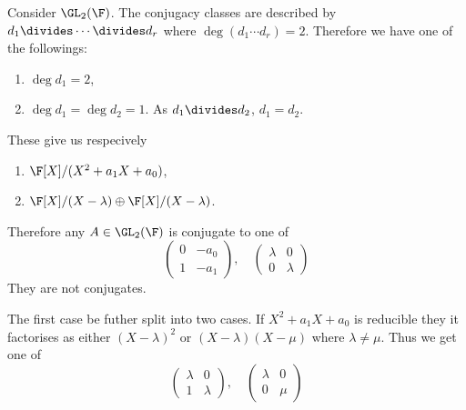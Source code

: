 \documentclass[a4paper]{article}
\theoremstyle{definition}
\begin{document}
\begin{eg}
  Consider \(\GL_2(\F)\). The conjugacy classes are described by \(d_1 \divides \cdots \divides d_r\) where \(\deg (d_1 \cdots d_r) = 2\). Therefore we have one of the followings:
  \begin{enumerate}
  \item \(\deg d_1 = 2\),
  \item \(\deg d_1 = \deg d_2 = 1\). As \(d_1 \divides d_2\), \(d_1 = d_2\).
  \end{enumerate}
  These give us respecively
  \begin{enumerate}
  \item \(\F[X]/(X^2 + a_1X + a_0)\),
  \item \(\F[X]/(X - \lambda) \oplus \F[X]/(X - \lambda)\).
  \end{enumerate}

  Therefore any \(A \in \GL_2(\F)\) is conjugate to one of
  \[
    \begin{pmatrix}
      0 & -a_0 \\
      1 & -a_1
    \end{pmatrix}
    ,\quad
    \begin{pmatrix}
      \lambda & 0 \\
      0 & \lambda
    \end{pmatrix}
  \]
  They are not conjugates.

  The first case be futher split into two cases. If \(X^2 + a_1X + a_0\) is reducible they it factorises as either \((X - \lambda)^2\) or \((X - \lambda)(X - \mu)\) where \(\lambda \neq \mu\). Thus we get one of
  \[
    \begin{pmatrix}
      \lambda & 0 \\
      1 & \lambda
    \end{pmatrix}
    ,\quad
    \begin{pmatrix}
      \lambda & 0 \\
      0 & \mu
    \end{pmatrix}
  \]
\end{eg}
\end{document}
